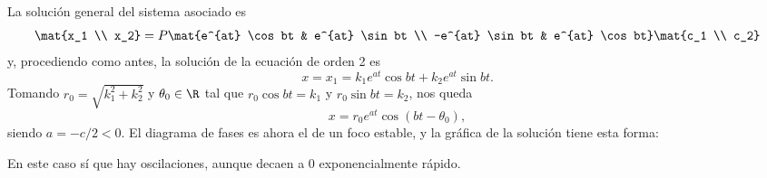 \documentclass[../main.tex]{subfiles}
\begin{document}
\begin{itemize}
    La solución general del sistema asociado es
    \[\mat{x_1 \\ x_2} = P \mat{e^{at} \cos bt & e^{at} \sin bt \\ -e^{at} \sin
        bt & e^{at} \cos bt} \mat{c_1 \\ c_2}\]
    y, procediendo como antes, la solución de la ecuación de orden 2 es
    \[x = x_1 = k_1e^{at} \cos bt + k_2e^{at} \sin bt.\]
    Tomando \(r_0 = \sqrt{k_1^2+k_2^2}\) y \(\theta_0 \in \R\) tal que \(r_0
    \cos bt = k_1\) y \(r_0 \sin bt = k_2\), nos queda
    \[x = r_0e^{at} \cos (bt - \theta_0),\]
    siendo \(a = -c/2 < 0\). El diagrama de fases es ahora el de un foco
    estable, y la gráfica de la solución tiene esta forma:
    \begin{figure}[ht]
      \centering
    \end{figure}

    En este caso sí que hay oscilaciones, aunque decaen a 0 exponencialmente rápido.
  \end{itemize}
\end{document}
